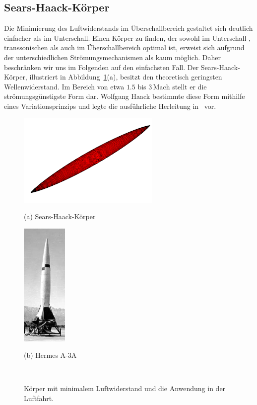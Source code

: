 \subsection{Sears-Haack-Körper}
Die Minimierung des Luftwiderstands im Überschallbereich 
gestaltet sich deutlich einfacher als im Unterschall. 
Einen Körper zu finden, der sowohl im Unterschall-, 
transsonischen als auch im Überschallbereich optimal ist, 
erweist sich aufgrund der unterschiedlichen 
Strömungsmechanismen als kaum möglich.
Daher beschränken wir uns im Folgenden auf den einfachsten Fall.
Der Sears-Haack-Körper, illustriert in Abbildung~\ref{fig:sears_haack}(a), 
besitzt den theoretisch geringsten Wellenwiderstand. 
Im Bereich von etwa $1.5$ bis $3\,\mathrm{Mach}$ 
stellt er die strömungsgünstigste Form dar. 
Wolfgang Haack bestimmte diese Form mithilfe eines 
Variationsprinzips und legte die ausführliche Herleitung 
in~\cite{Haack1941} vor.
\begin{figure}
    \centering
    \begin{minipage}[t]{0.48\textwidth}
       \centering
        \includegraphics[height=4.5cm]{papers/ueberschall/figures/Sears-Haack.png}
        \caption*{(a) Sears-Haack-Körper~\cite{SearsHaackWikipedia}}
    \end{minipage}
    \hfill
    \begin{minipage}[t]{0.48\textwidth}
        \centering
        \includegraphics[height=6cm]{papers/ueberschall/figures/hermes-a3a.jpg}
        \caption*{(b) Hermes A-3A~\cite{WeebauHermesA3A}}
    \end{minipage}
    \caption{Körper mit minimalem Luftwiderstand und die Anwendung in der Luftfahrt.}
    ~\label{fig:sears_haack}
\end{figure}
